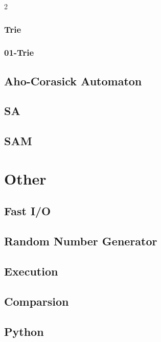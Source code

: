 \documentclass[10pt,a4paper]{article}
\begin{document}
\begin{multicols}{2}
\subsubsection{Trie}



\subsubsection{01-Trie}



\subsection{Aho-Corasick Automaton}


\subsection{SA}


\subsection{SAM}



\newpage

\section{Other}

\subsection{Fast I/O}


\subsection{Random Number Generator}


\subsection{Execution}




\subsection{Comparsion}


\subsection{Python}


\end{multicols}
\end{document}
